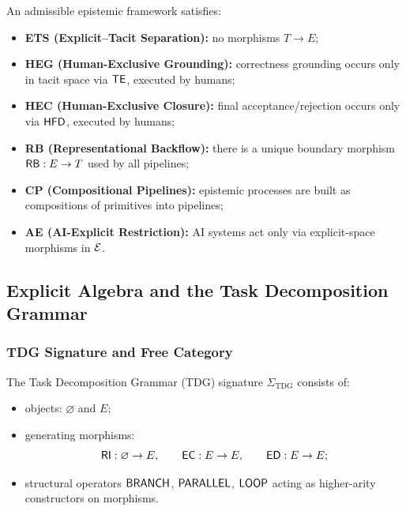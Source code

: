 \begin{definition}
An admissible epistemic framework satisfies:
\begin{itemize}
  \item \textbf{ETS (Explicit--Tacit Separation):} no morphisms \(T \to E\);
  \item \textbf{HEG (Human-Exclusive Grounding):} correctness grounding occurs
        only in tacit space via \(\mathsf{TE}\), executed by humans;
  \item \textbf{HEC (Human-Exclusive Closure):} final acceptance/rejection occurs
        only via \(\mathsf{HFD}\), executed by humans;
  \item \textbf{RB (Representational Backflow):} there is a unique boundary
        morphism \(\mathsf{RB} : E \to T\) used by all pipelines;
  \item \textbf{CP (Compositional Pipelines):} epistemic processes are built as
        compositions of primitives into pipelines;
  \item \textbf{AE (AI-Explicit Restriction):} AI systems act only via
        explicit-space morphisms in \(\mathcal{E}\).
\end{itemize}
\end{definition}

\subsection{Explicit Algebra and the Task Decomposition Grammar}
\label{sec:appendix-tdg}

\subsubsection{TDG Signature and Free Category}

\begin{definition}
The Task Decomposition Grammar (TDG) signature \(\Sigma_{\mathrm{TDG}}\)
consists of:
\begin{itemize}
  \item objects: \(\varnothing\) and \(E\);
  \item generating morphisms:
  \[
    \mathsf{RI} : \varnothing \to E,\qquad
    \mathsf{EC} : E \to E,\qquad
    \mathsf{ED} : E \to E;
  \]
  \item structural operators \(\mathsf{BRANCH}\), \(\mathsf{PARALLEL}\), \(\mathsf{LOOP}\) acting
        as higher-arity constructors on morphisms.
\end{itemize}
\end{definition}

